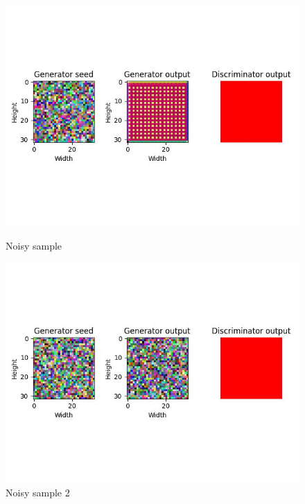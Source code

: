 \documentclass[conference]{IEEEtran}
\begin{document}
\begin{figure}[!h]
    \centering
    \includegraphics[scale=0.20]{images/noisy sample.jpg}
    \caption{Noisy sample} \label{noisy sample}
    \centering
    \includegraphics[scale=0.20]{images/noisy sample 2.jpg}
    \caption{Noisy sample 2} \label{noisy sample 2}
\end{figure}
\end{document}
